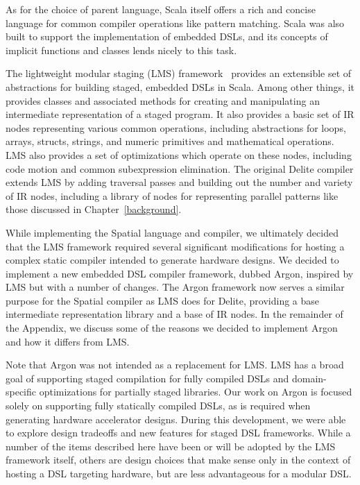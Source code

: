 As for the choice of parent language,
Scala itself offers a rich and concise language for common
compiler operations like pattern matching. Scala was also built to support
the implementation of embedded DSLs, and its concepts of implicit functions
and classes lends nicely to this task.

The lightweight modular staging (LMS) framework~\cite{lms} provides an
extensible set of abstractions for building staged, embedded DSLs in
Scala. Among other things, it provides classes and associated methods for creating
and manipulating an intermediate representation of a staged program.
It also provides a basic set of IR nodes representing various common operations,
including abstractions for loops, arrays, structs, strings, and numeric primitives
and mathematical operations.
LMS also provides a set of optimizations which operate on these nodes,
including code motion and common subexpression elimination.
The original Delite compiler extends LMS by adding traversal passes and
building out the number and variety of IR nodes, including a library of nodes
for representing parallel patterns like those discussed in Chapter~\ref{background}.

While implementing the Spatial language and compiler,
we ultimately decided that the LMS framework required several significant
modifications for hosting a complex static compiler intended to generate hardware designs.
We decided to implement a new embedded DSL compiler framework, dubbed Argon,
inspired by LMS but with a number of changes.
The Argon framework now serves a similar purpose for the Spatial compiler
as LMS does for Delite,
providing a base intermediate representation library and a base of IR nodes.
In the remainder of the Appendix, we discuss some of the reasons
we decided to implement Argon and how it differs from LMS.

Note that Argon was not intended as a replacement for LMS.
LMS has a broad goal of supporting staged compilation for
fully compiled DSLs and domain-specific optimizations for partially staged libraries.
Our work on Argon is focused solely on supporting fully statically compiled
DSLs, as is required when generating hardware accelerator designs.
During this development, we were able
to explore design tradeoffs and new features for staged DSL frameworks.
While a number of the items described here have been or will be adopted
by the LMS framework itself, others are design choices that
make sense only in the context of hosting a DSL targeting hardware,
but are less advantageous for a modular DSL.

